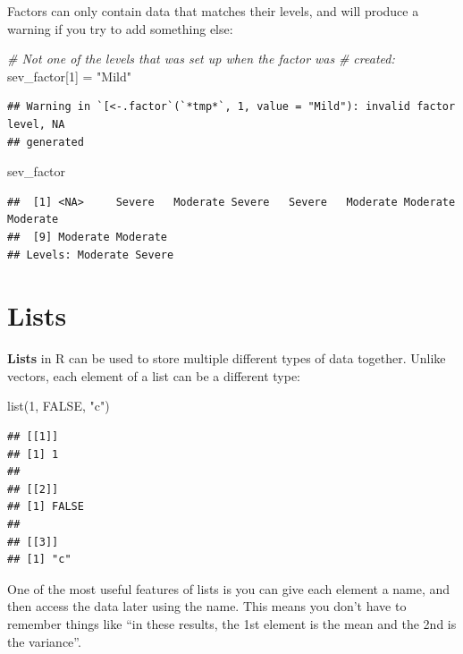 \documentclass[
]{book}
\newenvironment{Shaded}{\begin{snugshade}}{\end{snugshade}}
\newcommand{\CommentTok}[1]{\textcolor[rgb]{0.56,0.35,0.01}{\textit{#1}}}
\newcommand{\ConstantTok}[1]{\textcolor[rgb]{0.00,0.00,0.00}{#1}}
\newcommand{\DecValTok}[1]{\textcolor[rgb]{0.00,0.00,0.81}{#1}}
\newcommand{\FunctionTok}[1]{\textcolor[rgb]{0.00,0.00,0.00}{#1}}
\newcommand{\NormalTok}[1]{#1}
\newcommand{\OtherTok}[1]{\textcolor[rgb]{0.56,0.35,0.01}{#1}}
\newcommand{\StringTok}[1]{\textcolor[rgb]{0.31,0.60,0.02}{#1}}
\begin{document}
Factors can only contain data that matches their levels,
and will produce a warning if you try to add something else:

\begin{Shaded}
\begin{Highlighting}[]
\CommentTok{\# Not one of the levels that was set up when the factor was}
\CommentTok{\#   created:}
\NormalTok{sev\_factor[}\DecValTok{1}\NormalTok{] }\OtherTok{=} \StringTok{"Mild"}
\end{Highlighting}
\end{Shaded}

\begin{verbatim}
## Warning in `[<-.factor`(`*tmp*`, 1, value = "Mild"): invalid factor level, NA
## generated
\end{verbatim}

\begin{Shaded}
\begin{Highlighting}[]
\NormalTok{sev\_factor}
\end{Highlighting}
\end{Shaded}

\begin{verbatim}
##  [1] <NA>     Severe   Moderate Severe   Severe   Moderate Moderate Moderate
##  [9] Moderate Moderate
## Levels: Moderate Severe
\end{verbatim}

\hypertarget{lists}{%
\section{Lists}\label{lists}}

\textbf{Lists} in R can be used to store multiple different types of
data together. Unlike vectors, each element of a list can be a
different type:

\begin{Shaded}
\begin{Highlighting}[]
\FunctionTok{list}\NormalTok{(}\DecValTok{1}\NormalTok{, }\ConstantTok{FALSE}\NormalTok{, }\StringTok{"c"}\NormalTok{)}
\end{Highlighting}
\end{Shaded}

\begin{verbatim}
## [[1]]
## [1] 1
## 
## [[2]]
## [1] FALSE
## 
## [[3]]
## [1] "c"
\end{verbatim}

One of the most useful features of lists is you can give
each element a name, and then access the data later using
the name. This means you don't have to remember things like
``in these results, the 1st element is the mean and the 2nd is the
variance''.
\end{document}
